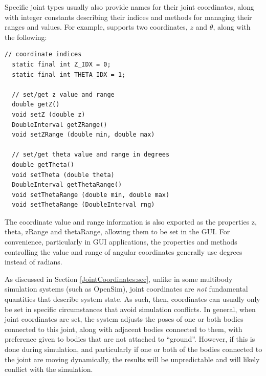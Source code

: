 Specific joint types usually also provide names for their joint
coordinates, along with integer constants describing their indices
and methods for managing their ranges and
values. For example,
supports two coordinates, $z$ and $\theta$, along with
the following:
%
\begin{lstlisting}[]
  // coordinate indices
  static final int Z_IDX = 0;
  static final int THETA_IDX = 1;

  // set/get z value and range
  double getZ()
  void setZ (double z)
  DoubleInterval getZRange()
  void setZRange (double min, double max)

  // set/get theta value and range in degrees
  double getTheta()
  void setTheta (double theta)
  DoubleInterval getThetaRange()
  void setThetaRange (double min, double max)
  void setThetaRange (DoubleInterval rng)
\end{lstlisting}
%
The coordinate value and range information is also exported as the
properties {\sf z}, {\sf theta}, {\sf zRange} and {\sf thetaRange},
allowing them to be set in the GUI. For convenience, particularly in
GUI applications, the properties and methods controlling the value and
range of angular coordinates generally use degrees instead of radians.

As discussed in Section \ref{JointCoordinates:sec}, unlike in some
multibody simulation systems (such as OpenSim), joint coordinates are
{\it not} fundamental quantities that describe system state. As such,
then, coordinates can usually only be set in specific circumstances
that avoid simulation conflicts. In general, when joint coordinates
are set, the system adjusts the poses of one or both bodies connected
to this joint, along with adjacent bodies connected to them, with
preference given to bodies that are not attached to ``ground''.
However, if this is done during simulation, and particularly if one or
both of the bodies connected to the joint are moving dynamically, the
results will be unpredictable and will likely conflict with the
simulation.

